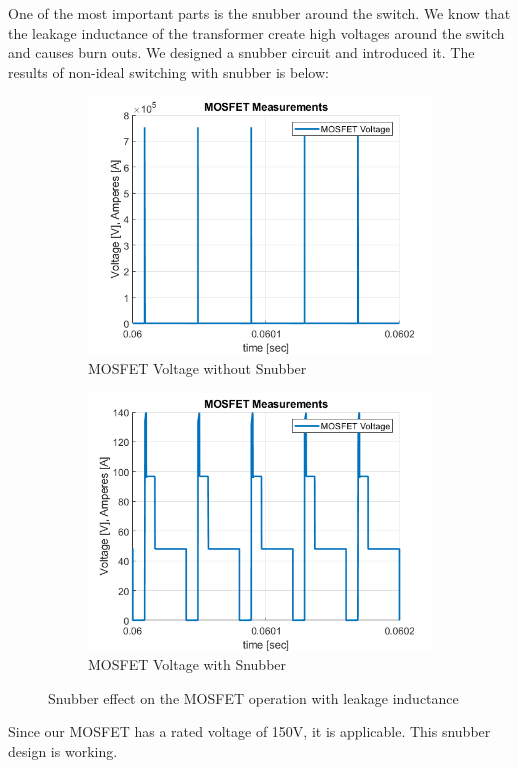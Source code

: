 One of the most important parts is the snubber around the switch. We know that the leakage inductance of the transformer create high voltages around the switch and causes burn outs. We designed a snubber circuit and introduced it. The results of non-ideal switching with snubber is below:

\begin{figure}[H]
\centering
\begin{subfigure}{7 cm}
  \centering
  \includegraphics[width=7 cm]{Figs/nosnubber.png}
  \caption{MOSFET Voltage without Snubber}
  \label{fig:input_current_24_com}
\end{subfigure}%
\begin{subfigure}{7 cm}
  \centering
  \includegraphics[width=7 cm]{Figs/snubber.png}
  \caption{MOSFET Voltage with Snubber}
  \label{fig:inductor_current_24_com}
\end{subfigure}
\caption{Snubber effect on the MOSFET operation with leakage inductance}
\label{fig:snubber}
\end{figure}

Since our MOSFET has a rated voltage of 150V, it is applicable. This snubber design is working.


